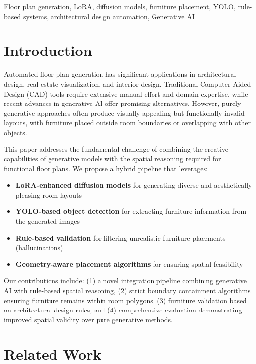 \documentclass[10pt,conference]{IEEEtran}
\begin{document}
\begin{IEEEkeywords}
Floor plan generation, LoRA, diffusion models, furniture placement, YOLO, rule-based systems, architectural design automation, Generative AI
\end{IEEEkeywords}

\section{Introduction}

Automated floor plan generation has significant applications in architectural design, real estate visualization, and interior design. Traditional Computer-Aided Design (CAD) tools require extensive manual effort and domain expertise, while recent advances in generative AI offer promising alternatives. However, purely generative approaches often produce visually appealing but functionally invalid layouts, with furniture placed outside room boundaries or overlapping with other objects.

This paper addresses the fundamental challenge of combining the creative capabilities of generative models with the spatial reasoning required for functional floor plans. We propose a hybrid pipeline that leverages:

\begin{itemize}
\item \textbf{LoRA-enhanced diffusion models} for generating diverse and aesthetically pleasing room layouts
\item \textbf{YOLO-based object detection} for extracting furniture information from the generated images
\item \textbf{Rule-based validation} for filtering unrealistic furniture placements (hallucinations)
\item \textbf{Geometry-aware placement algorithms} for ensuring spatial feasibility
\end{itemize}

Our contributions include: (1) a novel integration pipeline combining generative AI with rule-based spatial reasoning, (2) strict boundary containment algorithms ensuring furniture remains within room polygons, (3) furniture validation based on architectural design rules, and (4) comprehensive evaluation demonstrating improved spatial validity over pure generative methods.

\section{Related Work}
\end{document}
